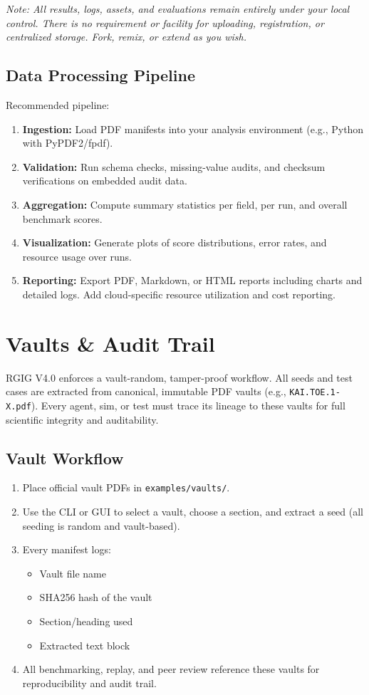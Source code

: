 \documentclass[11pt]{article}
\begin{document}
\noindent\emph{Note: All results, logs, assets, and evaluations remain entirely under your local control. There is no requirement or facility for uploading, registration, or centralized storage. Fork, remix, or extend as you wish.}

\subsection*{Data Processing Pipeline}
Recommended pipeline:
\begin{enumerate}
  \item \textbf{Ingestion:}  Load PDF manifests into your analysis environment (e.g., Python with PyPDF2/fpdf).
  \item \textbf{Validation:}  Run schema checks, missing-value audits, and checksum verifications on embedded audit data.
  \item \textbf{Aggregation:}  Compute summary statistics per field, per run, and overall benchmark scores.
  \item \textbf{Visualization:}  Generate plots of score distributions, error rates, and resource usage over runs.
  \item \textbf{Reporting:}  Export PDF, Markdown, or HTML reports including charts and detailed logs. Add cloud-specific resource utilization and cost reporting.
\end{enumerate}

\section*{Vaults \& Audit Trail}
RGIG V4.0 enforces a vault-random, tamper-proof workflow. All seeds and test cases are extracted from canonical, immutable PDF vaults (e.g., \texttt{KAI.TOE.1-X.pdf}). Every agent, sim, or test must trace its lineage to these vaults for full scientific integrity and auditability.

\subsection*{Vault Workflow}
\begin{enumerate}
  \item Place official vault PDFs in \texttt{examples/vaults/}.
  \item Use the CLI or GUI to select a vault, choose a section, and extract a seed (all seeding is random and vault-based).
  \item Every manifest logs:
    \begin{itemize}
      \item Vault file name
      \item SHA256 hash of the vault
      \item Section/heading used
      \item Extracted text block
    \end{itemize}
  \item All benchmarking, replay, and peer review reference these vaults for reproducibility and audit trail.
\end{enumerate}
\end{document}
